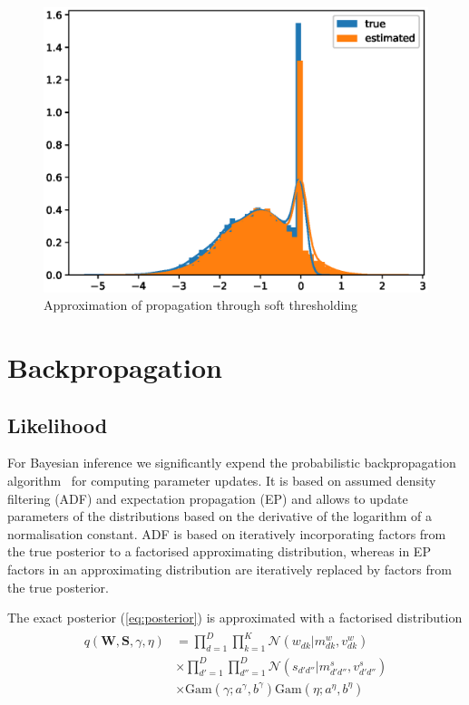 \documentclass[letterpaper]{article}
\begin{document}
\begin{figure}[t]
\includegraphics[width=\columnwidth]{z_new_testing}
\caption{Approximation of propagation through soft thresholding}
\label{fig:z_new_testing}
\end{figure}


\section{Backpropagation}
\label{sec:backpropagation}
\subsection{Likelihood}
For Bayesian inference we significantly expend the probabilistic backpropagation algorithm~\citep{hernandez2015probabilistic} for computing parameter updates. It is based on assumed density filtering (ADF) and expectation propagation (EP) and allows to update parameters of the distributions based on the derivative of the logarithm of a normalisation constant. ADF is based on iteratively incorporating factors from the true posterior to a factorised approximating distribution, whereas in EP factors in an approximating distribution are iteratively replaced by factors from the true posterior.

The exact posterior (\ref{eq:posterior}) is approximated with a factorised distribution
\begin{align}
\begin{split}
q(\mathbf{W}, \mathbf{S}, \gamma, \eta) &= \prod_{d=1}^D\prod_{k=1}^K \mathcal{N}(w_{dk} | m^w_{dk}, v^w_{dk}) \\
&\times \prod_{d'=1}^D\prod_{d''=1}^D \mathcal{N}(s_{d'd''} | m^s_{d'd''}, v^s_{d'd''}) \\
&\times \text{Gam}(\gamma; a^\gamma, b^\gamma) \text{Gam}(\eta; a^\eta, b^\eta) 
\end{split}
\end{align}
\end{document}

